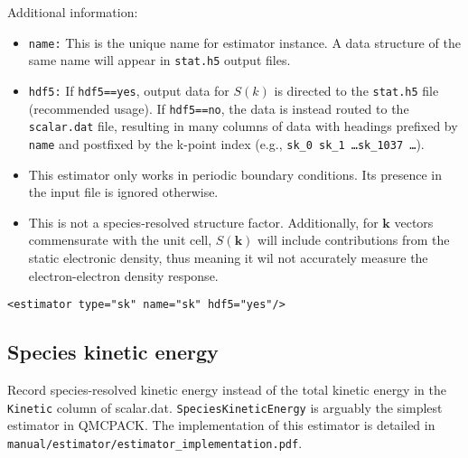 Additional information:
\begin{itemize}
  \item{\texttt{name:} This is the unique name for estimator instance.  A data structure of the same name will appear in \texttt{stat.h5} output files.}
  \item{\texttt{hdf5:} If \texttt{hdf5==yes}, output data for $S(k)$ is directed to the \texttt{stat.h5} file (recommended usage).  If \texttt{hdf5==no}, the data is instead routed to the \texttt{scalar.dat} file, resulting in many columns of data with headings prefixed by \texttt{name} and postfixed by the k-point index (e.g., \texttt{sk\_0 sk\_1 \ldots sk\_1037 \ldots}).}
  \item{This estimator only works in periodic boundary conditions.  Its presence in the input file is ignored otherwise.}
  \item{This is not a species-resolved structure factor.  Additionally, for $\mathbf{k}$ vectors commensurate with the unit cell, $S(\mathbf{k})$ will include contributions from the static electronic density, thus meaning it wil not accurately measure the electron-electron density response.  }
\end{itemize}

\begin{lstlisting}[style=QMCPXML,caption=Static structure factor estimator element.]
  <estimator type="sk" name="sk" hdf5="yes"/>
\end{lstlisting}



\subsection{Species kinetic energy}
Record species-resolved kinetic energy instead of the total kinetic energy in the \verb|Kinetic| column of scalar.dat. \verb|SpeciesKineticEnergy| is arguably the simplest estimator in QMCPACK. The implementation of this estimator is detailed in \verb|manual/estimator/estimator_implementation.pdf|.


